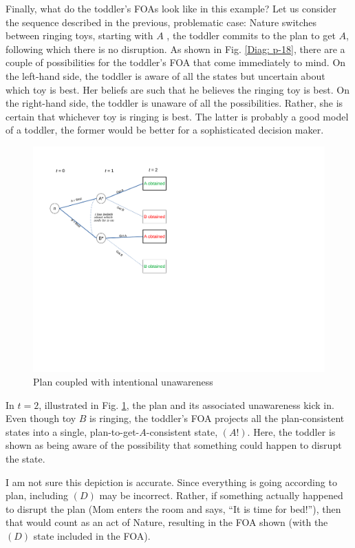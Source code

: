 \documentclass[
11pt,
titlepage,
reqno,
]{article}%
\theoremstyle{definition}
\begin{document}
Finally, what do the toddler's FOAs look like in this example? Let us consider the sequence described in the previous, problematic case: Nature switches between ringing toys, starting with $A$ , the toddler commits to the plan to get $A$, following which there is no disruption. As shown in Fig. \ref{Diag: p-18}, there are a couple of possibilities for the toddler's FOA that come immediately to mind. On the left-hand side, the toddler is aware of all the states but uncertain about which toy is best. Her beliefs are such that he believes the ringing toy is best. On the right-hand side, the toddler is unaware of all the possibilities. Rather, she is certain that whichever toy is ringing is best. The latter is probably a good model of a toddler, the former would be better for a sophisticated decision maker.

\begin{figure}[h!]
	\centering
	\includegraphics*[page=19,trim = 0in 4in 1in 0in,scale=.65]{Awareness_Diagrams_All}
	\caption{Plan coupled with intentional unawareness\label{Diag: p-19}}%
\end{figure}

In $t=2$, illustrated in Fig. \ref{Diag: p-19}, the plan and its associated unawareness kick in. Even though toy $B$ is ringing, the toddler's FOA projects all the plan-consistent states into a single, plan-to-get-$A$-consistent state, $(A!)$. Here, the toddler is shown as being aware of the possibility that something could happen to disrupt the state. 

I am not sure this depiction is accurate. Since everything is going according to plan, including $(D)$ may be incorrect. Rather, if something actually happened to disrupt the plan (Mom enters the room and says, ``It is time for bed!''), then that would count as an act of Nature, resulting in the FOA shown (with the $(D)$ state included in the FOA). 
\end{document}
